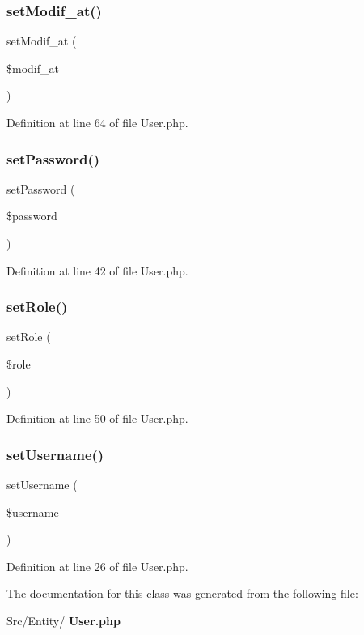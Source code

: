 \subsubsection{set\+Modif\+\_\+at()}
{\footnotesize\ttfamily set\+Modif\+\_\+at (\begin{DoxyParamCaption}\item[{Date\+Time}]{\$modif\+\_\+at }\end{DoxyParamCaption})}



Definition at line 64 of file User.\+php.

\mbox{\label{class_src_1_1_entity_1_1_user_a3e35c8d3dbb2c513c618a664389e0926}} 
\subsubsection{set\+Password()}
{\footnotesize\ttfamily set\+Password (\begin{DoxyParamCaption}\item[{}]{\$password }\end{DoxyParamCaption})}



Definition at line 42 of file User.\+php.

\mbox{\label{class_src_1_1_entity_1_1_user_aa9233284be00bee150c4982e73785b72}} 
\subsubsection{set\+Role()}
{\footnotesize\ttfamily set\+Role (\begin{DoxyParamCaption}\item[{}]{\$role }\end{DoxyParamCaption})}



Definition at line 50 of file User.\+php.

\mbox{\label{class_src_1_1_entity_1_1_user_ac359b701a2ccaff746dd480f03314244}} 
\subsubsection{set\+Username()}
{\footnotesize\ttfamily set\+Username (\begin{DoxyParamCaption}\item[{}]{\$username }\end{DoxyParamCaption})}



Definition at line 26 of file User.\+php.



The documentation for this class was generated from the following file\+:\begin{DoxyCompactItemize}
\item 
Src/\+Entity/\textbf{ User.\+php}\end{DoxyCompactItemize}
